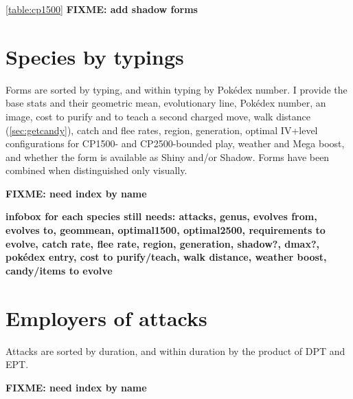 \documentclass[ebook,10pt,openany,oneside]{memoir}
\begin{document}
\autoref{table:cp1500}
\textbf{FIXME: add shadow forms}


\chapter{Species by typings}
\label{chap:speciesbytype}
Forms are sorted by typing, and within typing by Pokédex number.
I provide the base stats and their geometric mean, evolutionary line,
 Pokédex number, an image, cost to purify and to teach a second charged
 move, walk distance (\autoref{sec:getcandy}), catch and flee rates,
 region, generation, optimal IV+level configurations for CP1500-
 and CP2500-bounded play, weather and Mega boost, and whether the
 form is available as Shiny and/or Shadow.
Forms have been combined when distinguished only visually.

\textbf{FIXME: need index by name}

\textbf{infobox for each species still needs: attacks, genus, evolves from, evolves to, geommean, optimal1500, optimal2500,
           requirements to evolve, catch rate, flee rate, region, generation, shadow?, dmax?,
           pokédex entry, cost to purify/teach, walk distance, weather boost, candy/items to evolve}

\chapter{Employers of attacks}
\label{chap:attackemployers}
Attacks are sorted by duration, and within duration by the product of DPT and EPT.

\textbf{FIXME: need index by name}
\end{document}
